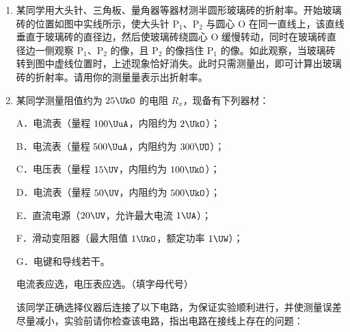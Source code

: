\documentclass[\gkver]{gaokaozhenti}
\begin{document}
\begin{enumerate}
\begin{enumerate}
	\item
	某同学用大头针、三角板、量角器等器材测半圆形玻璃砖的折射率。开始玻璃砖的位置如图中实线所示，使大头针 P$_{1}$、P$_{2}$ 与圆心 O 在同一直线上，该直线垂直于玻璃砖的直径边，然后使玻璃砖绕圆心 O 缓慢转动，同时在玻璃砖直径边一侧观察 P$_{1}$、P$_{2}$ 的像，且 P$_{2}$ 的像挡住 P$_{1}$ 的像。如此观察，当玻璃砖转到图中虚线位置时，上述现象恰好消失。此时只需测量出\underline{\hspace{2.4cm}}，即可计算出玻璃砖的折射率。请用你的测量量表示出折射率\underline{\hspace{1.6cm}}。

	\item
	某同学测量阻值约为 $25\UkO$ 的电阻 $R_{x}$，现备有下列器材：

	A．电流表（量程 $100\UuA$，内阻约为 $2\UkO$）；

	B．电流表（量程 $500\UuA$，内阻约为 $300\UO$）；

	C．电压表（量程 $15\UV$，内阻约为 $100\UkO$）；

	D．电流表（量程 $50\UV$，内阻约为 $500\UkO$）；

	E．直流电源（$20\UV$，允许最大电流 $1\UA$）；

	F．滑动变阻器（最大阻值 $1\UkO$，额定功率 $1\UW$）；

	G．电键和导线若干。

	电流表应选\underline{\hspace{1.6cm}}，电压表应选\underline{\hspace{1.6cm}}。（填字母代号）

	该同学正确选择仪器后连接了以下电路，为保证实验顺利进行，并使测量误差尽量减小，实验前请你检查该电路，指出电路在接线上存在的问题：


\end{enumerate}
\end{enumerate}
\end{document}
